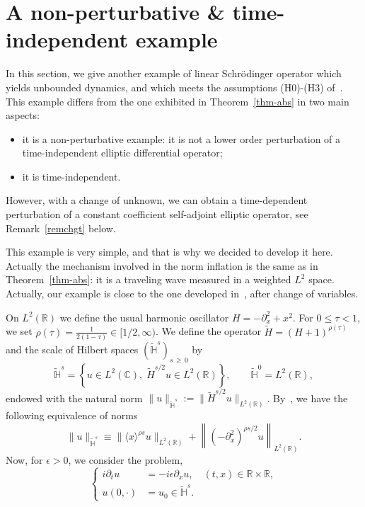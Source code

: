 \documentclass[AHL,Unicode,published]{cedram}
\newcommand{\C}{\mathbb{C}}
\newcommand{\R}{\mathbb{R}}
\newcommand{\HH}{\mathbb{H}}
\newcommand*\eps{\epsilon}
\newcommand{\wt}{\widetilde}
\newcommand{\<}{\langle}
\renewcommand{\>}{\rangle}
\newcommand{\R}{\mathbb{R}}
\begin{document}
\appendix
\section{A non-perturbative \& time-independent example}\label{appendixA}

In this section, we give another example of linear Schr\"odinger operator which yields unbounded dynamics, and which meets the assumptions (H0)-(H3) of~\cite{MasRo}. This example differs from the one exhibited in Theorem~\ref{thm-abs} in two main aspects:
\begin{itemize}
\item it is a non-perturbative example: it is not a lower order perturbation of a time-independent elliptic differential operator;
\item it is time-independent.
\end{itemize}

However, with a change of unknown, we can obtain a time-dependent perturbation of a constant coefficient self-adjoint elliptic operator, see Remark~\ref{remchgt} below.

This example is very simple, and that is why we decided to develop it here. Actually the mechanism involved in the norm inflation is the same as in Theorem~\ref{thm-abs}: it is a traveling wave measured in a weighted $L^2$ space. Actually, our example is close to the one developed in~\cite[Appendix A]{BGMR2}, after change of variables.


On $L^2(\R)$ we define the usual harmonic oscillator $H=-\partial^2_x +x^2$. For $0\leq \tau <1$, we set $\rho(\tau)=\frac1{2(1-\tau)} \in [1/2,\infty)$. We define the operator $\wt{H}=(H+1)^{\rho(\tau)}$ and the scale of Hilbert spaces $(\widetilde{\HH}^{s})_{s\,\geq\,0}$ by
\[
\widetilde{\HH}^{s} = \left\{ u\in L^2(\C),\; \wt{H}^{s/2}u\in L^2(\R)\right\}, \qquad \widetilde{\HH}^{0} =L^2(\R),
\]
endowed with the natural norm $\|u\|_{\widetilde{\HH}^{s}} := \|
\wt{H}^{s/2}u \|_{L^2(\R)} $. By~\cite[Lemma~2.4]{YajimaZhang2}, we have the following equivalence of norms
\begin{equation}\label{equiv}
\|u\|_{\widetilde{\HH}^{s}} \equiv \|\<x\>^{\rho s}u\|_{L^2(\R)}+\left\|\left(-\partial^2_x\right)^{\rho s/2}u\right\|_{L^2(\R)}.
\end{equation}
Now, for $\eps>0$, we consider the problem,
\begin{equation}\label{partial}
\begin{cases}
i\partial_t u &=-i\eps \partial_x u, \quad (t,x)\in \R\times \R,\\
u(0, \cdot) &= u_0 \in \widetilde{\HH}^{s}.
\end{cases}
\end{equation}
\end{document}
